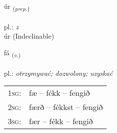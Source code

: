 \documentclass[frontgrid, backgrid]{flacards}\usepackage[]{graphicx}\usepackage[]{xcolor}
\begin{document}
\renewcommand{\blhead}{\vskip5pt {\small\bfseries\footnotesize Forsetning | Preposition }}
\renewcommand{\bcfoot}{\vskip5pt \hspace{2pt}{\small\bfseries\footnotesize 1K}}


{úr \small{\textsubscript{(\textit{prep.})}} \\[1ex]
\textphonetic{[uːr]} \\
pl.: \emph{z} \\  [2ex]
úr (Indeclinable)}

\renewcommand{\flhead}{\vskip5pt \fboxsep=0pt {\small\bfseries\footnotesize Sagnorð | Verb}}
\renewcommand{\fcfoot}{\vskip5pt \fboxsep=0pt \hspace{2pt}{\small\bfseries\footnotesize 1K}}

\renewcommand{\blhead}{\vskip5pt {\small\bfseries\footnotesize Sagnorð | Verb }}
\renewcommand{\bcfoot}{\vskip5pt \hspace{2pt}{\small\bfseries\footnotesize 1K}}


{fá \small{\textsubscript{(\textit{v.})}} \\[1ex] %
\textphonetic{[fauː]} \\
pl.: \emph{otrzymywać; dozwolony; uzyskać} \\  [2ex]
\renewcommand*{\arraystretch}{0.8}
\begin{tabular}{p{1cm}l}
\textsc{1sg}: & fæ -- fékk -- fengið \\ 
\textsc{2sg}: & færð -- fékkst -- fengið \\ 
\textsc{3sg}: & fær -- fékk -- fengið \\ 
\end{tabular}
}


\renewcommand{\flhead}{\vskip5pt \fboxsep=0pt {\small\bfseries\footnotesize Forsetning | Preposition}}
\renewcommand{\fcfoot}{\vskip5pt \fboxsep=0pt \hspace{2pt}{\small\bfseries\footnotesize 1K}}

\renewcommand{\blhead}{\vskip5pt {\small\bfseries\footnotesize Forsetning | Preposition }}
\renewcommand{\bcfoot}{\vskip5pt \hspace{2pt}{\small\bfseries\footnotesize 1K}}
\end{document}
